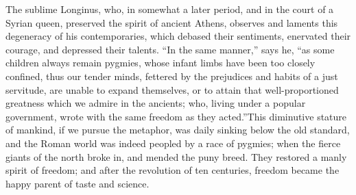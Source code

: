 
The sublime Longinus, who, in somewhat a later period, and in the
court of a Syrian queen, preserved the spirit of ancient Athens,
observes and laments this degeneracy of his contemporaries, which
debased their sentiments, enervated their courage, and depressed
their talents. “In the same manner,” says he, “as some children
always remain pygmies, whose infant limbs have been too closely
confined, thus our tender minds, fettered by the prejudices and
habits of a just servitude, are unable to expand themselves, or
to attain that well-proportioned greatness which we admire in the
ancients; who, living under a popular government, wrote with the
same freedom as they acted.”\footnotemark[111] This diminutive stature of
mankind, if we pursue the metaphor, was daily sinking below the
old standard, and the Roman world was indeed peopled by a race of
pygmies; when the fierce giants of the north broke in, and mended
the puny breed. They restored a manly spirit of freedom; and
after the revolution of ten centuries, freedom became the happy
parent of taste and science.


